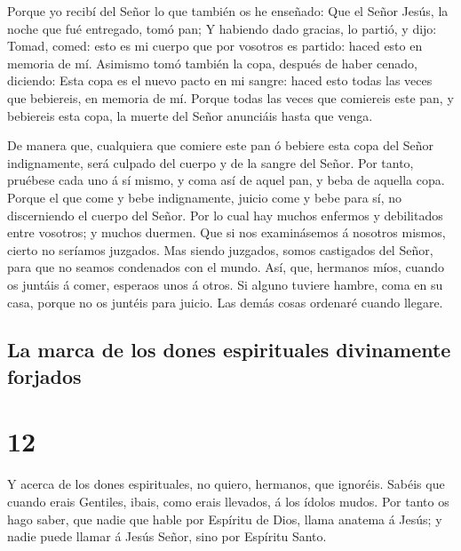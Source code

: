  Porque yo recibí del Señor lo que también os he enseñado:
Que el Señor Jesús, la noche que fué entregado, tomó pan; 
Y habiendo dado gracias, lo partió, y dijo: Tomad, comed: esto es mi
cuerpo que por vosotros es partido: haced esto en memoria de mí.
 Asimismo tomó también la copa, después de haber cenado,
diciendo: Esta copa es el nuevo pacto en mi sangre: haced esto todas las
veces que bebiereis, en memoria de mí.  Porque todas las
veces que comiereis este pan, y bebiereis esta copa, la muerte del Señor
anunciáis hasta que venga.

 De manera que, cualquiera que comiere este pan ó bebiere
esta copa del Señor indignamente, será culpado del cuerpo y de la sangre
del Señor.  Por tanto, pruébese cada uno á sí mismo, y coma
así de aquel pan, y beba de aquella copa.  Porque el que
come y bebe indignamente, juicio come y bebe para sí, no discerniendo el
cuerpo del Señor.  Por lo cual hay muchos enfermos y
debilitados entre vosotros; y muchos duermen.  Que si nos
examinásemos á nosotros mismos, cierto no seríamos juzgados.
 Mas siendo juzgados, somos castigados del Señor, para que
no seamos condenados con el mundo.  Así, que, hermanos
míos, cuando os juntáis á comer, esperaos unos á otros.  Si
alguno tuviere hambre, coma en su casa, porque no os juntéis para
juicio. Las demás cosas ordenaré cuando llegare.

\hypertarget{la-marca-de-los-dones-espirituales-divinamente-forjados}{%
\subsection{La marca de los dones espirituales divinamente
forjados}\label{la-marca-de-los-dones-espirituales-divinamente-forjados}}

\hypertarget{section-11}{%
\section{12}\label{section-11}}

 Y acerca de los dones espirituales, no quiero, hermanos,
que ignoréis.  Sabéis que cuando erais Gentiles, ibais, como
erais llevados, á los ídolos mudos.  Por tanto os hago
saber, que nadie que hable por Espíritu de Dios, llama anatema á Jesús;
y nadie puede llamar á Jesús Señor, sino por Espíritu Santo.

